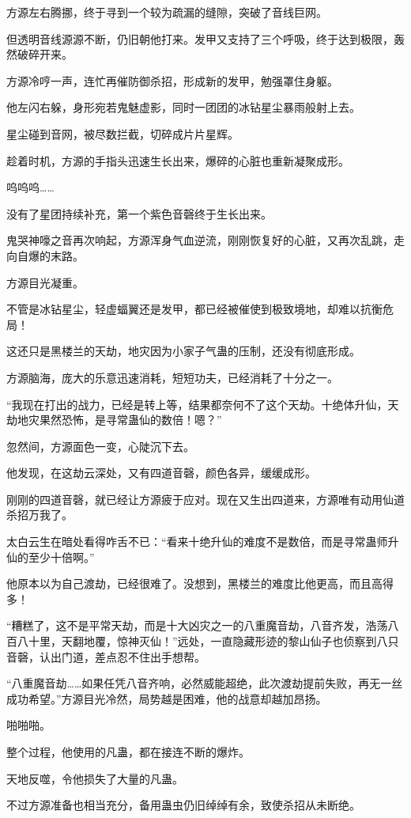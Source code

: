 \begin{this_body}
方源左右腾挪，终于寻到一个较为疏漏的缝隙，突破了音线巨网。

但透明音线源源不断，仍旧朝他打来。发甲又支持了三个呼吸，终于达到极限，轰然破碎开来。

方源冷哼一声，连忙再催防御杀招，形成新的发甲，勉强罩住身躯。

他左闪右躲，身形宛若鬼魅虚影，同时一团团的冰钻星尘暴雨般射上去。

星尘碰到音网，被尽数拦截，切碎成片片星辉。

趁着时机，方源的手指头迅速生长出来，爆碎的心脏也重新凝聚成形。

呜呜呜……

没有了星团持续补充，第一个紫色音磬终于生长出来。

鬼哭神嚎之音再次响起，方源浑身气血逆流，刚刚恢复好的心脏，又再次乱跳，走向自爆的末路。

方源目光凝重。

不管是冰钻星尘，轻虚蝠翼还是发甲，都已经被催使到极致境地，却难以抗衡危局！

这还只是黑楼兰的天劫，地灾因为小家子气蛊的压制，还没有彻底形成。

方源脑海，庞大的乐意迅速消耗，短短功夫，已经消耗了十分之一。

“我现在打出的战力，已经是转上等，结果都奈何不了这个天劫。十绝体升仙，天劫地灾果然恐怖，是寻常蛊仙的数倍！嗯？”

忽然间，方源面色一变，心陡沉下去。

他发现，在这劫云深处，又有四道音磬，颜色各异，缓缓成形。

刚刚的四道音磬，就已经让方源疲于应对。现在又生出四道来，方源唯有动用仙道杀招万我了。

太白云生在暗处看得咋舌不已：“看来十绝升仙的难度不是数倍，而是寻常蛊师升仙的至少十倍啊。”

他原本以为自己渡劫，已经很难了。没想到，黑楼兰的难度比他更高，而且高得多！

“糟糕了，这不是平常天劫，而是十大凶灾之一的八重魔音劫，八音齐发，浩荡八百八十里，天翻地覆，惊神灭仙！”远处，一直隐藏形迹的黎山仙子也侦察到八只音磬，认出门道，差点忍不住出手想帮。

“八重魔音劫……如果任凭八音齐响，必然威能超绝，此次渡劫提前失败，再无一丝成功希望。”方源目光冷然，局势越是困难，他的战意却越加昂扬。

啪啪啪。

整个过程，他使用的凡蛊，都在接连不断的爆炸。

天地反噬，令他损失了大量的凡蛊。

不过方源准备也相当充分，备用蛊虫仍旧绰绰有余，致使杀招从未断绝。


\end{this_body}
